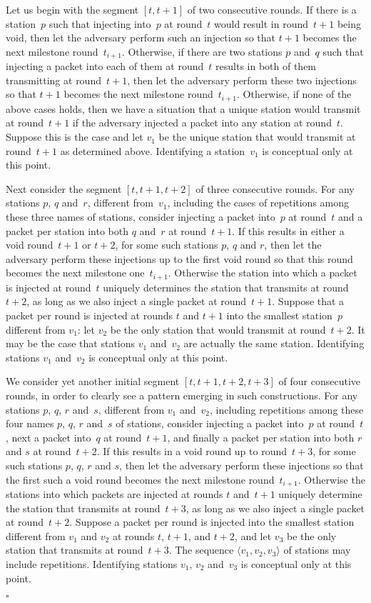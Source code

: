 \documentclass[11pt]{article}
\newcommand{\qed}{\hfill $\square$ \smallbreak}
\newenvironment{proof}{\noindent{\bf Proof:}}{\qed}
\begin{document}
\begin{proof}
Let us begin with the segment $[t,t+1]$ of two consecutive rounds.
If there is a station~$p$ such that injecting into~$p$ at round~$t$ would result in round~$t+1$ being void, then let the adversary perform such an injection so that $t+1$ becomes the next milestone round~$t_{i+1}$.
Otherwise, if there are two stations $p$ and~$q$ such that injecting a packet into each of them at round~$t$ results in both of them transmitting at round~$t+1$, then let the adversary perform these two injections so that $t+1$ becomes the next milestone round~$t_{i+1}$.
Otherwise, if none of the above cases holds, then we have a situation that a unique station would transmit at round~$t+1$ if the adversary injected a packet into any station at round~$t$.
Suppose this is the case and let $v_1$ be the unique station that would transmit at round~$t+1$ as determined above.
Identifying a station~$v_1$ is conceptual only at this point.

Next consider the segment $[t,t+1,t+2]$ of three consecutive rounds.
For any stations $p$, $q$ and~$r$, different from~$v_1$, including the cases of repetitions among these three names of stations, consider injecting a packet into~$p$ at round~$t$ and a packet per station into both $q$ and~$r$ at round~$t+1$.
If this results in either a void round~$t+1$ or $t+2$, for some such stations $p$, $q$ and $r$, then let the adversary perform these injections up to the first void round so that this round  becomes the next milestone one~$t_{i+1}$.
Otherwise the station into which a packet is injected at round~$t$ uniquely determines the station that transmits at round~$t+2$, as long as we also inject a single packet at round~$t+1$.
Suppose that a packet per round is injected at rounds $t$ and $t+1$ into the smallest station~$p$ different from $v_1$: let $v_2$ be the only station that would transmit at round~$t+2$.
It may be the case that stations $v_1$ and~$v_2$ are actually the same station.
Identifying stations $v_1$ and~$v_2$ is conceptual only at this point.

We consider yet another initial segment $[t,t+1,t+2,t+3]$ of four consecutive rounds, in order to clearly see a pattern emerging in such constructions.
For any stations $p$, $q$, $r$ and~$s$, different from $v_1$ and~$v_2$, including  repetitions among these four names $p$, $q$, $r$ and~$s$ of stations, consider injecting a packet into~$p$ at round~$t$, next a packet into~$q$ at round~$t+1$, and finally a packet per station into both $r$ and $s$ at round~$t+2$.
If this results in a void round up to round~$t+3$, for some such stations $p$, $q$, $r$ and $s$, then let the adversary perform these injections so that the first such a void round becomes the next milestone round~$t_{i+1}$.
Otherwise the stations into which packets are injected at rounds $t$ and~$t+1$ uniquely determine the station that transmits at round~$t+3$, as long as we also inject a single packet at round~$t+2$.
Suppose a packet per round is injected into the smallest station different from $v_1$ and $v_2$ at rounds $t$, $t+1$, and $t+2$, and let $v_3$ be the only station that transmits at round~$t+3$.
The sequence $\langle v_1,v_2,v_3\rangle$ of stations may include repetitions.
Identifying stations $v_1$, $v_2$ and~$v_3$ is conceptual only at this point.


\end{proof}
\end{document}
